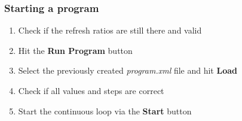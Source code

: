 \documentclass{article}
\newcounter{ListCounter}
\begin{document}
	\subsubsection{Starting a program}
\begin{enumerate}
\setcounter{enumi}{\value{ListCounter}}
\item Check if the refresh ratios are still there and valid
\item Hit the \textbf{Run Program} button
\item Select the previously created \textit{program.xml} file and hit \textbf{Load}
\item Check if all values and steps are correct
\item Start the continuous loop via the \textbf{Start} button
\end{enumerate}
\end{document}
